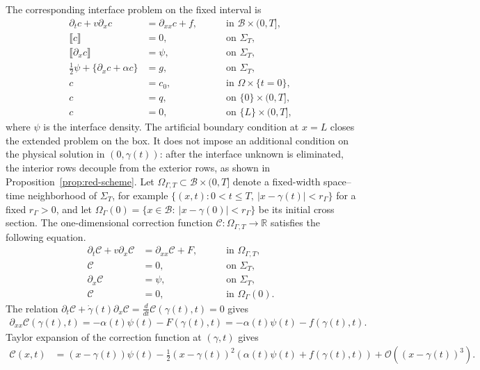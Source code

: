 \documentclass[11pt,reqno]{amsart}
\theoremstyle{plain}
\theoremstyle{definition}
\numberwithin{equation}{section}
\newcommand{\paren}[1]{\left(#1\right)}
\newcommand{\jump}[1]{\llbracket#1\rrbracket}
\newcommand{\p}{\partial}
\newcommand{\mc}[1]{\mathcal{#1}}
\newcommand{\R}{\mathbb{R}}
\newcommand{\Corr}{\mathcal C}
\begin{document}
The corresponding interface problem on the fixed interval is
\begin{equation}
\begin{aligned}
    \p_t c + v\p_x c &= \p_{xx} c + f,\quad && \text{ in }\mc B\times(0,T], \\
    \jump{c} &= 0, \quad && \text{ on }\Sigma_T,\\
    \jump{\p_x c} &= \psi, \quad && \text{ on }\Sigma_T,\\
    \frac{1}{2}\psi + \{ \p_x c +\alpha c\} &= g,\quad && \text{ on }\Sigma_T,\\
    c &= c_0, \quad && \text{ in }\Omega\times\{t=0\}, \\
    c &= q, \quad && \text{ on }\{0\}\times (0,T],\\
    c &= 0, \quad && \text{ on }\{L\}\times (0,T],
\end{aligned}
\end{equation}
where $\psi$ is the interface density.
The artificial boundary condition at $x=L$ closes the extended problem on the
box. It does not impose an additional condition on the physical solution
in $(0,\gamma(t))$: after the interface unknown is eliminated, the interior
rows decouple from the exterior rows, as shown in Proposition~\ref{prop:red-scheme}.
Let $\Omega_{\Gamma,T}\subset \mc B\times(0,T]$ denote a fixed-width space--time neighborhood of
$\Sigma_T$, for example $\{(x,t):0<t\le T,\ |x-\gamma(t)|<r_\Gamma\}$ for a
fixed $r_\Gamma>0$, and let $\Omega_\Gamma(0)=\{x\in\mc B:\ |x-\gamma(0)|<r_\Gamma\}$ be its
initial cross section. The one-dimensional correction function
$\Corr:\Omega_{\Gamma,T}\to \R$ satisfies the following equation.
\begin{equation}
\begin{aligned}
    \p_t \Corr + v\p_x \Corr &= \p_{xx} \Corr + F,\quad &&\text{ in }\Omega_{\Gamma,T}, \\
    \Corr &= 0, \quad &&\text{ on }\Sigma_T,\\
    \p_x \Corr &= \psi, \quad &&\text{ on }\Sigma_T,\\
    \Corr &= 0, \quad &&\text{ in } \Omega_\Gamma(0).
\end{aligned}
\end{equation}
The relation $\p_t \Corr + \dot{\gamma}(t)\p_x\Corr = \frac{d}{dt}\Corr(\gamma(t),t) = 0$ gives
\begin{align}
\p_{xx}\Corr(\gamma(t),t) = -\alpha(t)\psi(t) - F(\gamma(t),t) = -\alpha(t)\psi(t) - f(\gamma(t),t).
\end{align}
Taylor expansion of the correction function at $(\gamma,t)$ gives
\begin{equation}
\begin{aligned}
    \Corr(x,t) &= (x-\gamma(t))\psi(t) - \frac{1}{2}\paren{x-\gamma(t)}^2\paren{\alpha(t)\psi(t) + f(\gamma(t),t)} + \mc O\paren{\paren{x-\gamma(t)}^3}.
\end{aligned}
\end{equation}
\end{document}
